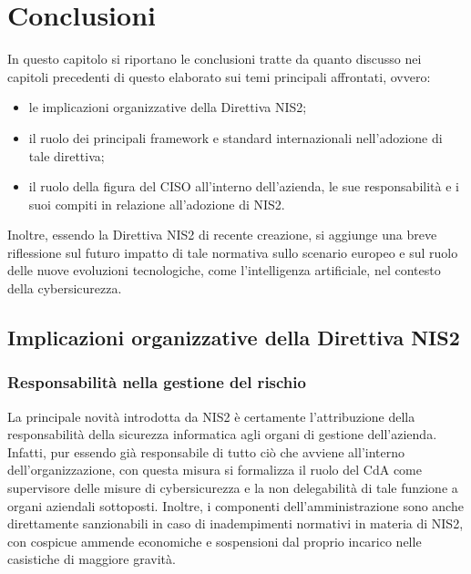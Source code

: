 \chapter{Conclusioni}
In questo capitolo si riportano le conclusioni tratte da quanto discusso nei capitoli precedenti
di questo elaborato sui temi principali affrontati, ovvero:
\begin{itemize}
    \item le implicazioni organizzative della Direttiva NIS2;
    \item il ruolo dei principali framework e standard internazionali nell'adozione di tale direttiva;
    \item il ruolo della figura del CISO all'interno dell'azienda, le sue responsabilità e i suoi compiti
        in relazione all'adozione di NIS2.
\end{itemize}
Inoltre, essendo la Direttiva NIS2 di recente creazione, si aggiunge una breve riflessione sul futuro impatto
di tale normativa sullo scenario europeo e sul ruolo delle nuove evoluzioni tecnologiche, come l'intelligenza
artificiale, nel contesto della cybersicurezza.



\section{Implicazioni organizzative della Direttiva NIS2}
\subsection{Responsabilità nella gestione del rischio}
La principale novità introdotta da NIS2 è certamente l'attribuzione della responsabilità
della sicurezza informatica agli organi di gestione dell'azienda. Infatti, pur essendo già
responsabile di tutto ciò che avviene all'interno dell'organizzazione, con questa misura si
formalizza il ruolo del CdA come supervisore delle misure di cybersicurezza e la non delegabilità
di tale funzione a organi aziendali sottoposti. Inoltre, i componenti dell'amministrazione sono 
anche direttamente sanzionabili in caso di inadempimenti normativi in materia di NIS2, con cospicue 
ammende economiche e sospensioni dal proprio incarico nelle casistiche di maggiore gravità.

